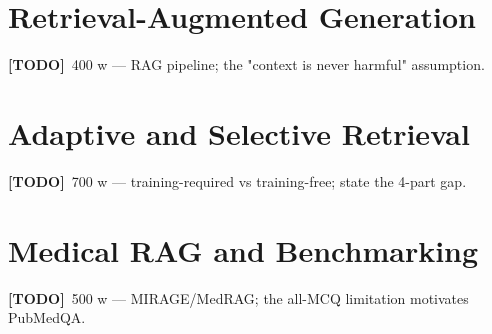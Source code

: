 \documentclass[11pt,a4paper]{report}
\newcommand{\todo}[1]{\par\noindent\textcolor{red!70!black}{\small\textbf{[TODO]}~#1}\par}
\begin{document}
\section{Retrieval-Augmented Generation}
\label{sec:bg-rag}
\todo{400 w — RAG pipeline; the "context is never harmful" assumption.}

\section{Adaptive and Selective Retrieval}
\label{sec:bg-adaptive}
\todo{700 w — training-required vs training-free; state the 4-part gap.}

\section{Medical RAG and Benchmarking}
\label{sec:bg-medical}
\todo{500 w — MIRAGE/MedRAG; the all-MCQ limitation motivates PubMedQA.}
\end{document}
